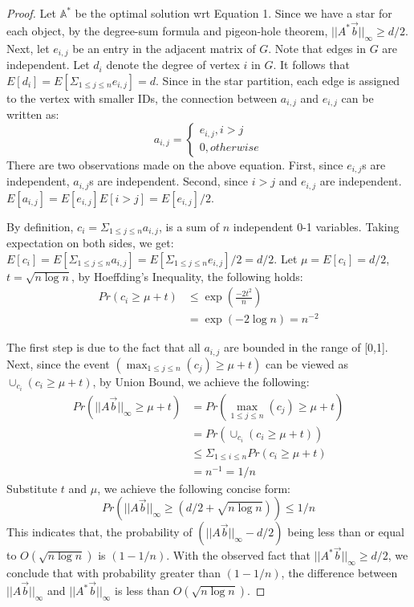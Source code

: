 \begin{proof}
Let $\mathbb{A}^*$ be the optimal solution wrt Equation 1. Since we have a star
for each object, by the degree-sum formula and pigeon-hole theorem, $||A^*\vec{b}||_\infty \geq d/2$.
Next, let $e_{i,j}$ be an entry in the adjacent matrix of $G$. Note that edges in $G$ are independent. 
Let $d_i$ denote the degree of vertex $i$ in $G$. 
It follows that $E[d_i]=E[\Sigma_{1\leq j \leq n}e_{i,j}]=d$.
Since in the star partition, each edge is assigned to the vertex
with smaller IDs, the connection between $a_{i,j}$ and $e_{i,j}$ can be written as:
\begin{equation*}
a_{i,j} = \begin{cases}
			e_{i,j}, i>j \\
			0, otherwise
		  \end{cases}  
\end{equation*}
There are two observations made on the above equation. First, since $e_{i,j}$s are independent,
$a_{i,j}$s are independent. Second, since $i>j$ and $e_{i,j}$ are independent. 
$E[a_{i,j}] = E[e_{i,j}]E[i>j]= E[e_{i,j}]/2$.

By definition, $c_i = \Sigma_{1\leq j \leq n} a_{i,j}$, 
is a sum of $n$ independent 0-1 variables. Taking expectation on both sides, 
we get: $E[c_i] = E[\Sigma_{1\leq j \leq n} a_{i,j}]=E[\Sigma_{1\leq j \leq n} e_{i,j}]/2 = d/2$. Let $\mu =E[c_i] = d/2$, 
$t = \sqrt{n\log n}$, by Hoeffding's Inequality, the following holds:
\begin{equation*}
\begin{split}
	Pr(c_i \geq \mu + t) 
						&\leq \exp(\frac{-2t^2}{n}) \\
						&= \exp(-2\log n) = n^{-2}
\end{split}
\end{equation*}

The first step is due to the fact that all $a_{i,j}$ are bounded in the range of [0,1]. 
Next, since the event $(\max_{1\leq j \leq n}(c_j) \geq \mu + t)$ can be viewed as
$\cup_{c_i} (c_i \geq \mu + t )$, by Union Bound, we achieve the following:
\begin{equation*}
\begin{split}
	Pr(||A\vec{b}||_\infty \geq \mu + t) &=Pr(\max_{1\leq j \leq n}(c_j) \geq \mu + t)  \\
		& = Pr(\cup_{c_i} (c_i \geq \mu + t )) \\
		&\leq \Sigma_{1 \leq i \leq n} Pr(c_i \geq \mu + t) \\
		& = n^{-1} = 1/n
\end{split}
\end{equation*}
Substitute $t$ and $\mu$, we achieve the following concise form:
\begin{equation*}
	Pr(||A\vec{b}||_\infty \geq (d/2 + \sqrt{n\log n})) \leq 1/n
\end{equation*}
This indicates that, the probability of $(||A\vec{b}||_\infty-d/2)$ being less than or equal to $ O(\sqrt{n\log n})$ is $(1-1/n)$. With the observed fact that $||A^*\vec{b}||_\infty \geq d/2$, we conclude that
with probability greater than $(1-1/n)$, 
the difference between $||A\vec{b}||_\infty$ and $||A^*\vec{b}||_\infty$ is less than $O(\sqrt{n\log n})$.
\end{proof}

